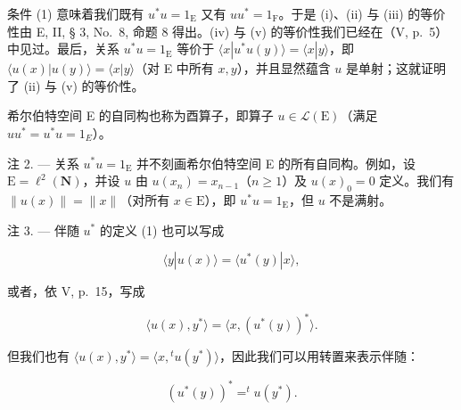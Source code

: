 条件 (1) 意味着我们既有 \(u^{*}u = 1_{\mathrm{E}}\) 又有 \(uu^{*} = 1_{\mathrm{F}}\)。于是 (i)、(ii) 与 (iii) 的等价性由 E, II, § 3, No.~8, 命题 8 得出。(iv) 与 (v) 的等价性我们已经在（V, p.~5）中见过。最后，关系 \(u^{*}u = 1_{\mathrm{E}}\) 等价于 \(\langle x|u^{*}u(y)\rangle = \langle x|y\rangle\)，即 \(\langle u(x)|u(y)\rangle = \langle x|y\rangle\)（对 E 中所有 \(x,y\)），并且显然蕴含 \(u\) 是单射；这就证明了 (ii) 与 (v) 的等价性。

希尔伯特空间 E 的自同构也称为酉算子，即算子 \(u \in \mathcal{L}(\mathrm{E})\)（满足 \(uu^{*} = u^{*}u = 1_{E}\)）。

注 2. --- 关系 \(u^{*}u = 1_{\mathrm{E}}\) 并不刻画希尔伯特空间 E 的所有自同构。例如，设 \(\mathrm{E} = \ell^2 (\mathbf{N})\)，并设 \(u\) 由 \(u(x_{n}) = x_{n - 1}\)（\(n\geqslant 1\)）及 \(u(x)_0 = 0\) 定义。我们有 \(\| u(x)\| = \| x\|\)（对所有 \(x\in \mathrm{E}\)），即 \(u^{*}u = 1_{\mathrm{E}}\)，但 \(u\) 不是满射。

注 3. --- 伴随 \(u^{*}\) 的定义 (1) 也可以写成

\[
\langle y | u (x) \rangle = \langle u ^ {*} (y) | x \rangle ,
\]

或者，依 V, p.~15，写成

\[
\langle u (x), y ^ {*} \rangle = \langle x, (u ^ {*} (y)) ^ {*} \rangle .
\]

但我们也有 \(\langle u(x), y^* \rangle = \langle x, {}^t u(y^*) \rangle\)，因此我们可以用转置来表示伴随：

\[
(u ^ {*} (y)) ^ {*} = ^ {t} u (y ^ {*}).
\]

